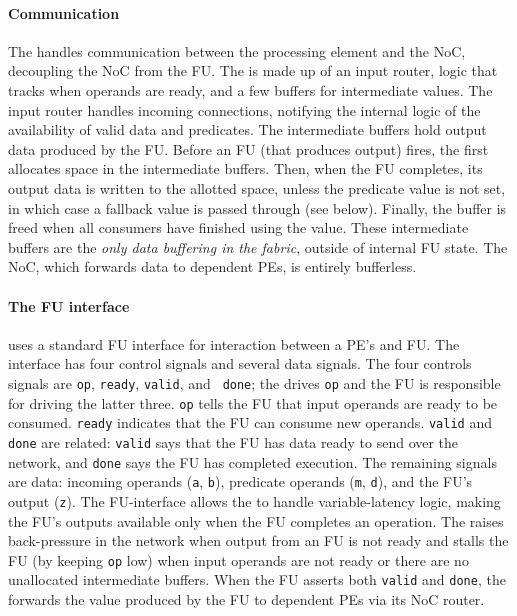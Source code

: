 \paragraph{Communication}
The \ucore handles communication between the processing element and the
NoC, decoupling the NoC from the FU.
% 
The \ucore is made up of an input router,
logic that tracks when operands are ready, and a few buffers for intermediate values.
% 
The input router handles incoming connections, notifying the internal \ucore
logic of the availability of valid data and predicates.
%
The intermediate buffers hold output data produced by the FU.
% 
Before an FU (that produces output) fires, the \ucore first allocates space in the intermediate buffers.
% 
Then, when the FU completes, its output data is written to the allotted space,
unless the predicate value is not set, in which case a fallback value is passed through (see below).
% 
Finally, the buffer is freed when all consumers have finished using the value.
% 
These intermediate buffers are the \emph{only data buffering in the fabric},
outside of internal FU state.
% 
The NoC, which forwards data to dependent PEs, is entirely bufferless.
%

\paragraph{The FU interface}
\label{snafu:flexible:fu}
\snafuframe uses a standard FU interface for interaction between a PE's \ucore
and FU. 
% 
The interface has four control signals and several data signals.
% 
The four controls signals are {\tt op}, {\tt ready}, {\tt valid}, and {\tt
done}; the \ucore drives {\tt op} and the FU is responsible for driving the
latter three.
% 
{\tt op} tells the FU that input operands are ready to be consumed. 
% 
{\tt ready} indicates that the FU can consume new operands.
% 
{\tt valid} and {\tt done} are related: {\tt valid} says that the FU has data
ready to send over the network, and {\tt done} says the FU has completed
execution.
% 
The remaining signals are data: incoming operands ({\tt a}, {\tt b}),
predicate operands ({\tt m}, {\tt d}), and the FU's output ({\tt z}).
% 
The FU-\ucore interface allows the \ucore to handle variable-latency logic, making the FU's outputs available only when the FU completes an operation.
% 
The \ucore raises back-pressure in the network when output from an FU is not ready and stalls the FU (by keeping {\tt op} low) when input operands are not ready or there are no unallocated intermediate buffers.
%
When the FU asserts both {\tt valid} and {\tt done}, the \ucore
forwards the value produced by the FU to dependent PEs via its NoC router.

